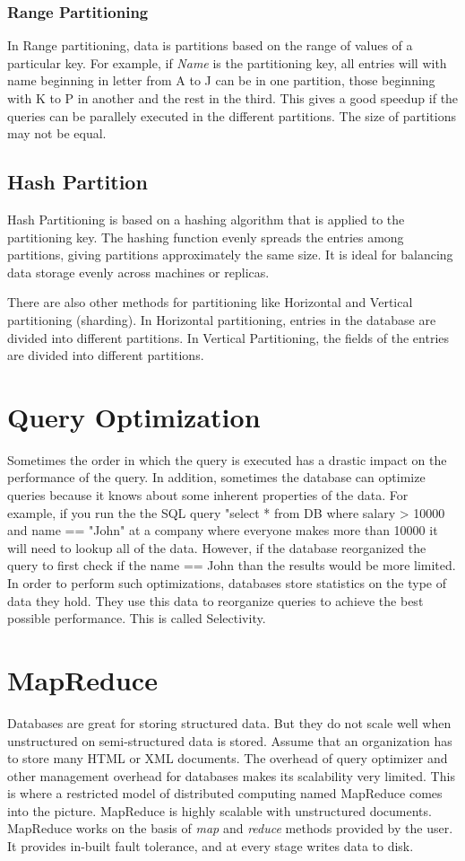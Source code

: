 \documentclass[twoside]{article}
\begin{document}
\subsubsection{Range Partitioning}
In Range partitioning, data is partitions based on the range of
values of a particular key. For example, if \textit{Name}
is the partitioning key, all entries will with name
beginning in letter from A to J can be in one partition,
those beginning with K to P in another and the rest in
the third. This gives a good speedup if the queries can
be parallely executed in the different partitions.
The size of partitions may not be equal.

\subsection{Hash Partition}
Hash Partitioning is based on a hashing algorithm
that is applied to the partitioning key. The hashing
function evenly spreads the entries among partitions,
giving partitions approximately the same size. It is
ideal for balancing data storage evenly across machines or replicas.

There are also other methods for partitioning
like Horizontal and Vertical partitioning (sharding).
In Horizontal partitioning, entries in the database are
divided into different partitions. In Vertical Partitioning, the
fields of the entries are divided into different partitions.

\section{Query Optimization}

Sometimes the order in which the query is executed
has a drastic impact on the performance of the query.
In addition, sometimes the database can optimize queries
because it knows about some inherent properties of the data.
For example, if you run the the SQL query "select * from DB where salary > 10000 and name == "John"
at a company where everyone makes more than 10000 it will need to lookup all of the data. However,
if the database reorganized the query to first check if the name == John than the results would be
more limited. In order to perform such optimizations, databases store statistics on the type
of data they hold. They use this data to reorganize queries to achieve the best possible performance.
This is called Selectivity.

\section{MapReduce}

Databases are great for storing structured data. But they
do not scale well when unstructured on semi-structured data
is stored. Assume that an organization has to store many HTML
or XML documents. The overhead of query optimizer and other
management overhead for databases makes its scalability very
limited. This is where a restricted model of distributed
computing named MapReduce comes into the picture. MapReduce
is highly scalable with unstructured documents. MapReduce
works on the basis of \textit{map} and \textit{reduce} methods
provided by the user. It provides in-built fault tolerance,
and at every stage writes data to disk.
\end{document}
